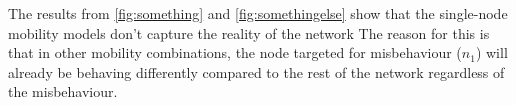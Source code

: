 The results from \autoref{fig:something} and \autoref{fig:somethingelse} show that the single-node mobility models don't capture the reality of the network 
The reason for this is that in other mobility combinations, the node targeted for misbehaviour ($n_1$) will already be behaving differently compared to the rest of the network regardless of the misbehaviour.

